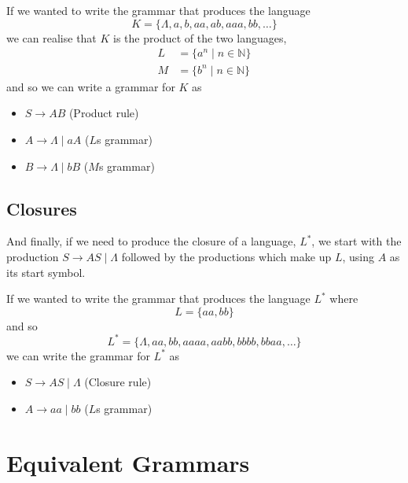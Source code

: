 \begin{example*}{}{}
  If we wanted to write the grammar that produces the language
  \begin{equation*}
    K = \{\Lambda, a, b, aa, ab, aaa, bb, \ldots\}
  \end{equation*}
  we can realise that $K$ is the product of the two languages,
  \begin{align*}
    L &= \{a^n \mid n \in \mathbb{N}\}\\
    M &= \{b^n \mid n \in \mathbb{N}\}
  \end{align*}
  and so we can write a grammar for $K$ as
  \begin{itemize}
    \item $S \rightarrow AB$ (Product rule)
    \item $A \rightarrow \Lambda \mid aA$ ($L$s grammar)
    \item $B \rightarrow \Lambda \mid bB$ ($M$s grammar)
  \end{itemize}
\end{example*}

\subsection*{Closures}

And finally, if we need to produce the closure of a language, $L^*$, we start with the production $S \rightarrow AS \mid \Lambda$
 followed by the productions which make up $L$, using $A$ as its start symbol.

\begin{example*}{}{}
  If we wanted to write the grammar that produces the language $L^*$ where
  \begin{equation*}
    L = \{aa, bb\}
  \end{equation*}
  and so
  \begin{equation*}
    L^* = \{\Lambda, aa, bb, aaaa, aabb, bbbb, bbaa, \ldots\}
  \end{equation*}
  we can write the grammar for $L^*$ as
  \begin{itemize}
    \item $S \rightarrow AS \mid \Lambda$ (Closure rule)
    \item $A \rightarrow aa \mid bb$ ($L$s grammar)
  \end{itemize}
\end{example*}

\section*{Equivalent Grammars}

